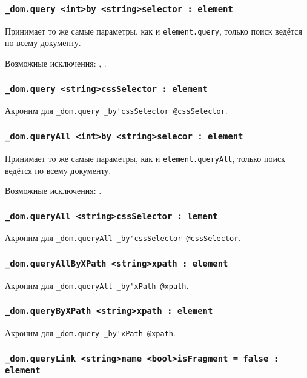 \subsubsection{\lstinline|_dom.query <int>by <string>selector : element|}

Принимает то же самые параметры, как и \lstinline|element.query|, только поиск ведётся по всему документу.

Возможные исключения: , .

\subsubsection{\lstinline|_dom.query <string>cssSelector : element|}

Акроним для \lstinline|_dom.query _by'cssSelector @cssSelector|.

\subsubsection{\lstinline|_dom.queryAll <int>by <string>selecor : element|}

Принимает то же самые параметры, как и \lstinline|element.queryAll|, только поиск ведётся по всему документу.

Возможные исключения: .

\subsubsection{\lstinline|_dom.queryAll <string>cssSelector : lement|}

Акроним для \lstinline|_dom.queryAll _by'cssSelector @cssSelector|.

\subsubsection{\lstinline|_dom.queryAllByXPath <string>xpath : element|}

Акроним для \lstinline|_dom.queryAll _by'xPath @xpath|.

\subsubsection{\lstinline|_dom.queryByXPath <string>xpath : element|}

Акроним для \lstinline|_dom.query _by'xPath @xpath|.

\subsubsection{\lstinline|_dom.queryLink <string>name <bool>isFragment = false : element|}

